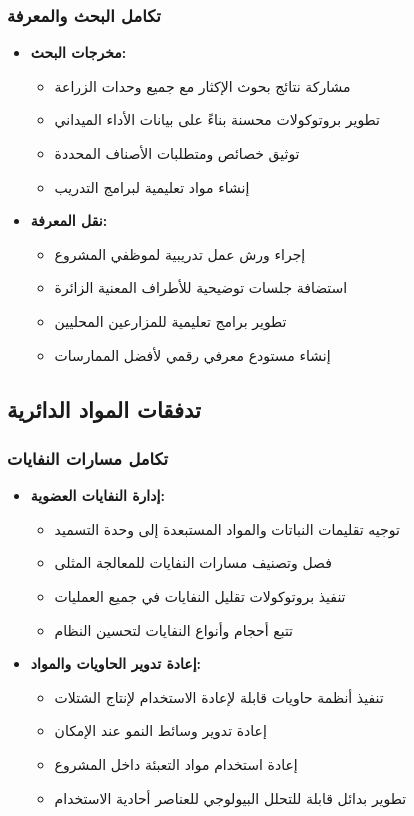 \subsubsection{تكامل البحث والمعرفة}
\begin{itemize}
    \item \textbf{مخرجات البحث:}
    \begin{itemize}
        \item مشاركة نتائج بحوث الإكثار مع جميع وحدات الزراعة
        \item تطوير بروتوكولات محسنة بناءً على بيانات الأداء الميداني
        \item توثيق خصائص ومتطلبات الأصناف المحددة
        \item إنشاء مواد تعليمية لبرامج التدريب
    \end{itemize}
    
    \item \textbf{نقل المعرفة:}
    \begin{itemize}
        \item إجراء ورش عمل تدريبية لموظفي المشروع
        \item استضافة جلسات توضيحية للأطراف المعنية الزائرة
        \item تطوير برامج تعليمية للمزارعين المحليين
        \item إنشاء مستودع معرفي رقمي لأفضل الممارسات
    \end{itemize}
\end{itemize}

\subsection{تدفقات المواد الدائرية}

\subsubsection{تكامل مسارات النفايات}
\begin{itemize}
    \item \textbf{إدارة النفايات العضوية:}
    \begin{itemize}
        \item توجيه تقليمات النباتات والمواد المستبعدة إلى وحدة التسميد
        \item فصل وتصنيف مسارات النفايات للمعالجة المثلى
        \item تنفيذ بروتوكولات تقليل النفايات في جميع العمليات
        \item تتبع أحجام وأنواع النفايات لتحسين النظام
    \end{itemize}
    
    \item \textbf{إعادة تدوير الحاويات والمواد:}
    \begin{itemize}
        \item تنفيذ أنظمة حاويات قابلة لإعادة الاستخدام لإنتاج الشتلات
        \item إعادة تدوير وسائط النمو عند الإمكان
        \item إعادة استخدام مواد التعبئة داخل المشروع
        \item تطوير بدائل قابلة للتحلل البيولوجي للعناصر أحادية الاستخدام
    \end{itemize}
\end{itemize}

